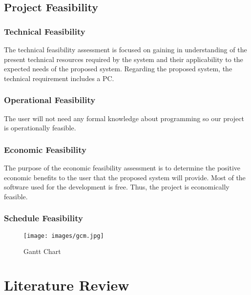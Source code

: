 \section{Project Feasibility}
\vspace{-18pt}
\subsection{Technical Feasibility}
\vspace{-18pt}
The technical feasibility assessment is focused on gaining in understanding of the present technical resources required by the system and their applicability to the expected needs of the proposed system. Regarding the proposed system, the technical requirement includes a PC.
\vspace{-18pt}
\subsection{Operational Feasibility}
\vspace{-18pt}
The user will not need any formal knowledge about programming so our project is operationally feasible.
\vspace{-18pt}
\subsection{Economic Feasibility}
\vspace{-18pt}
The purpose of the economic feasibility assessment is to determine the positive economic benefits to the user that the proposed system will provide. Most of the software used for the development is free. Thus, the project is economically feasible.
\vspace{-18pt}
\subsection{Schedule Feasibility}
\begin{figure}[!h] %
\begin{center}
	\texttt{[image: images/gcm.jpg]} 
	\caption{Gantt Chart} %
	\label{figGanttChart} %
\end{center}
\end{figure}
\chapter{Literature Review}
\vspace{-18pt}
